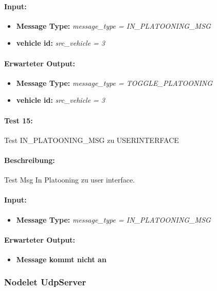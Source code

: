 \documentclass[a4paper, 12pt, titlepage]{scrartcl}
\begin{document}
{			\paragraph{Input:}
			\begin{itemize} \itemsep-0.5em
				\item \textbf{Message Type:} \emph{message\_type = IN\_PLATOONING\_MSG}
				\item \textbf{vehicle id:} \emph{src\_vehicle = 3}
			\end{itemize}
			\paragraph{Erwarteter Output:}
			\begin{itemize} \itemsep-0.5em
				\item \textbf{Message Type:} \emph{message\_type = TOGGLE\_PLATOONING}
				\item \textbf{vehicle id:} \emph{src\_vehicle = 3}
			\end{itemize}
			
			\paragraph{Test 15:}{Test IN\_PLATOONING\_MSG zu USERINTERFACE}
			\paragraph{Beschreibung:} Test Msg In Platooning zu user interface.
			\paragraph{Input:}
			\begin{itemize} \itemsep-0.5em
				\item \textbf{Message Type:} \emph{message\_type = IN\_PLATOONING\_MSG}
			\end{itemize}
			\paragraph{Erwarteter Output:}
			\begin{itemize} \itemsep-0.5em
				\item \textbf{Message kommt nicht an}
			\end{itemize}
			
			\subsubsection{Nodelet UdpServer}
			\label{node_upd_server}
}
\end{document}
